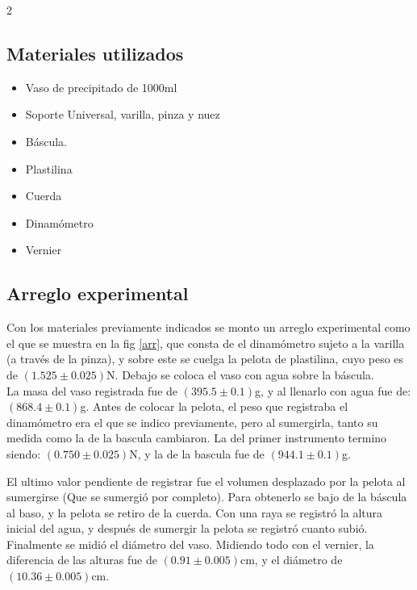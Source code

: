 \documentclass[10pt,letterpaper]{article}
\begin{document}
    \hline

    \begin{multicols}{2}
    
    \subsection{Materiales utilizados}

    \begin{itemize}
        \item Vaso de precipitado de 1000ml
        \item Soporte Universal, varilla, pinza y nuez
        \item Báscula.
        \item Plastilina
        \item Cuerda
        \item Dinamómetro
        \item Vernier
    \end{itemize}
    

   \subsection{Arreglo experimental}

    Con los materiales previamente indicados se monto un arreglo experimental como el que se muestra en la fig \ref{arr}, que consta de el dinamómetro sujeto a la varilla (a través de la pinza), y sobre este se cuelga la pelota de plastilina, cuyo peso es de $(1.525 \pm 0.025)$N. Debajo se coloca el vaso con agua sobre la báscula. \\

    La masa del vaso registrada fue de $(395.5 \pm 0.1)$g, y al llenarlo con agua fue de: $(868.4 \pm 0.1)$g. Antes de colocar la pelota, el peso que registraba el dinamómetro era el que se indico previamente, pero al sumergirla, tanto su medida como la de la bascula cambiaron. La del primer instrumento termino siendo: $(0.750 \pm 0.025)$N, y la de la bascula fue de $(944.1 \pm 0.1)$g.

    El ultimo valor pendiente de registrar fue el volumen desplazado por la pelota al sumergirse (Que se sumergió por completo). Para obtenerlo se bajo de la báscula al baso, y la pelota se retiro de la cuerda. Con una raya se registró la altura inicial del agua, y después de sumergir la pelota se registró cuanto subió. Finalmente se midió el diámetro del vaso. Midiendo todo con el vernier, la diferencia de las alturas fue de $(0.91 \pm 0.005)$cm, y el diámetro de $(10.36 \pm 0.005)$cm.


\end{multicols}
\end{document}
